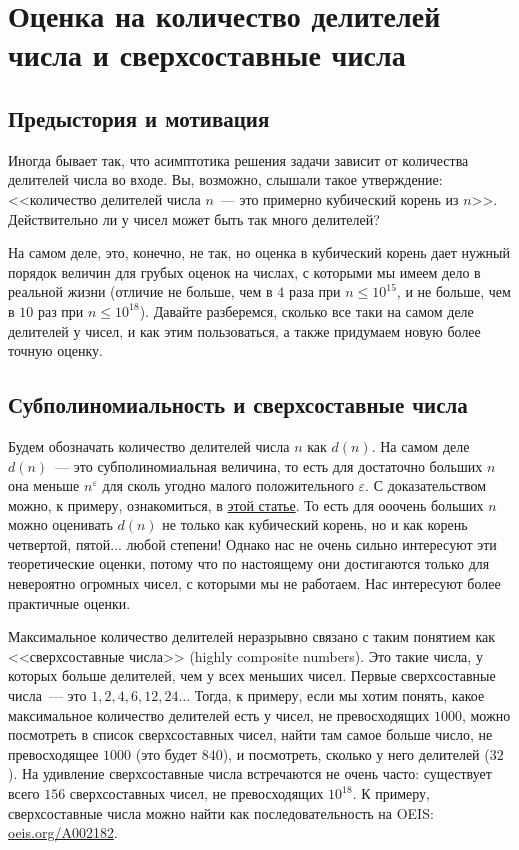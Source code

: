 \chapter{Оценка на количество делителей числа и сверхсоставные числа}

\section{Предыстория и мотивация}

Иногда бывает так, что асимптотика решения задачи зависит от количества делителей числа во входе. Вы, возможно, слышали такое утверждение: <<количество делителей числа $n$~--- это примерно кубический корень из $n$>>. Действительно ли у чисел может быть так много делителей?

На самом деле, это, конечно, не так, но оценка в кубический корень дает нужный порядок величин для грубых оценок на числах, с которыми мы имеем дело в реальной жизни (отличие не больше, чем в $4$ раза при $n \le 10^{15}$, и не больше, чем в $10$ раз при $n \le 10^{18}$). Давайте разберемся, сколько все таки на самом деле делителей у чисел, и как этим пользоваться, а также придумаем новую более точную оценку.


\section{Субполиномиальность и сверхсоставные числа}

Будем обозначать количество делителей числа $n$ как $d(n)$. На самом деле $d(n)$~--- это субполиномиальная величина, то есть для достаточно больших $n$ она меньше $n^{\varepsilon}$ для сколь угодно малого положительного $\varepsilon$. С доказательством можно, к примеру, ознакомиться, в \href{https://codeforces.com/blog/entry/3863}{этой статье}. То есть для ооочень больших $n$ можно оценивать $d(n)$ не только как кубический корень, но и как корень четвертой, пятой... любой степени! Однако нас не очень сильно интересуют эти теоретические оценки, потому что по настоящему они достигаются только для невероятно огромных чисел, с которыми мы не работаем. Нас интересуют более практичные оценки.

Максимальное количество делителей неразрывно связано с таким понятием как <<сверхсоставные числа>> (highly composite numbers). Это такие числа, у которых больше делителей, чем у всех меньших чисел. Первые сверхсоставные числа~--- это $1, 2, 4, 6, 12, 24\ldots$ Тогда, к примеру, если мы хотим понять, какое максимальное количество делителей есть у чисел, не превосходящих $1000$, можно посмотреть в список сверхсоставных чисел, найти там самое больше число, не превосходящее $1000$ (это будет $840$), и посмотреть, сколько у него делителей ($32$). На удивление сверхсоставные числа встречаются не очень часто: существует всего $156$ сверхсоставных чисел, не превосходящих $10^{18}$. К примеру, сверхсоставные числа можно найти как последовательность на OEIS: \href{https://oeis.org/A002182}{oeis.org/A002182}.

